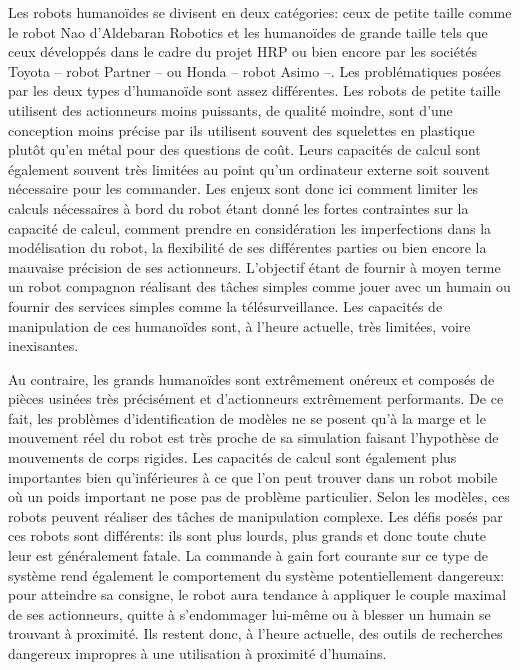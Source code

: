 Les robots humanoïdes se divisent en deux catégories: ceux de petite
taille comme le robot Nao d'Aldebaran Robotics \citep{wikipedia.nao}
et les humanoïdes de grande taille tels que ceux développés dans le
cadre du projet HRP ou bien encore par les sociétés Toyota -- robot
Partner -- ou Honda -- robot Asimo --. Les problématiques posées par
les deux types d'humanoïde sont assez différentes. Les robots de
petite taille utilisent des actionneurs moins puissants, de qualité
moindre, sont d'une conception moins précise par ils utilisent souvent
des squelettes en plastique plutôt qu'en métal pour des questions de
coût. Leurs capacités de calcul sont également souvent très limitées
au point qu'un ordinateur externe soit souvent nécessaire pour les
commander. Les enjeux sont donc ici comment limiter les calculs
nécessaires à bord du robot étant donné les fortes contraintes sur la
capacité de calcul, comment prendre en considération les imperfections
dans la modélisation du robot, la flexibilité de ses différentes
parties ou bien encore la mauvaise précision de ses
actionneurs. L'objectif étant de fournir à moyen terme un robot
compagnon réalisant des tâches simples comme jouer avec un humain ou
fournir des services simples comme la télésurveillance. Les capacités
de manipulation de ces humanoïdes sont, à l'heure actuelle, très
limitées, voire inexisantes.


Au contraire, les grands humanoïdes sont extrêmement onéreux et
composés de pièces usinées très précisément et d'actionneurs
extrêmement performants. De ce fait, les problèmes d'identification de
modèles ne se posent qu'à la marge et le mouvement réel du robot est
très proche de sa simulation faisant l'hypothèse de mouvements de
corps rigides. Les capacités de calcul sont également plus importantes
bien qu'inférieures à ce que l'on peut trouver dans un robot mobile où
un poids important ne pose pas de problème particulier. Selon les
modèles, ces robots peuvent réaliser des tâches de manipulation
complexe. Les défis posés par ces robots sont différents: ils sont
plus lourds, plus grands et donc toute chute leur est généralement
fatale. La commande à gain fort courante sur ce type de système rend
également le comportement du système potentiellement dangereux: pour
atteindre sa consigne, le robot aura tendance à appliquer le couple
maximal de ses actionneurs, quitte à s'endommager lui-même ou à
blesser un humain se trouvant à proximité. Ils restent donc, à l'heure
actuelle, des outils de recherches dangereux impropres à une
utilisation à proximité d'humains.


